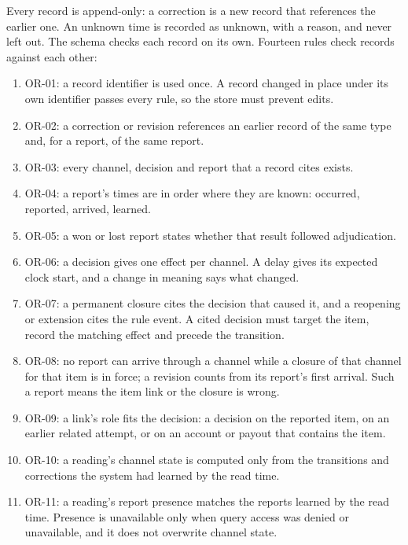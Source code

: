 \documentclass[
  11pt,
]{article}
\providecommand{\tightlist}{%
  \setlength{\itemsep}{0pt}\setlength{\parskip}{0pt}}
\renewcommand{\tightlist}{\setlength{\itemsep}{0pt plus 1pt}\setlength{\parskip}{0pt}}
\begin{document}
\endgroup

Every record is append-only: a correction is a new record that
references the earlier one. An unknown time is recorded as unknown, with
a reason, and never left out. The schema checks each record on its own.
Fourteen rules check records against each other:

\begin{enumerate}
\def\labelenumi{\arabic{enumi}.}
\tightlist
\item
  \mbox{OR-01}: a record identifier is used once. A record changed in
  place under its own identifier passes every rule, so the store must
  prevent edits.
\item
  \mbox{OR-02}: a correction or revision references an earlier record of
  the same type and, for a report, of the same report.
\item
  \mbox{OR-03}: every channel, decision and report that a record cites
  exists.
\item
  \mbox{OR-04}: a report's times are in order where they are known:
  occurred, reported, arrived, learned.
\item
  \mbox{OR-05}: a won or lost report states whether that result followed
  adjudication.
\item
  \mbox{OR-06}: a decision gives one effect per channel. A delay gives
  its expected clock start, and a change in meaning says what changed.
\item
  \mbox{OR-07}: a permanent closure cites the decision that caused it,
  and a reopening or extension cites the rule event. A cited decision
  must target the item, record the matching effect and precede the
  transition.
\item
  \mbox{OR-08}: no report can arrive through a channel while a closure
  of that channel for that item is in force; a revision counts from its
  report's first arrival. Such a report means the item link or the
  closure is wrong.
\item
  \mbox{OR-09}: a link's role fits the decision: a decision on the
  reported item, on an earlier related attempt, or on an account or
  payout that contains the item.
\item
  \mbox{OR-10}: a reading's channel state is computed only from the
  transitions and corrections the system had learned by the read time.
\item
  \mbox{OR-11}: a reading's report presence matches the reports learned
  by the read time. Presence is unavailable only when query access was
  denied or unavailable, and it does not overwrite channel state.

\end{enumerate}
\end{document}
